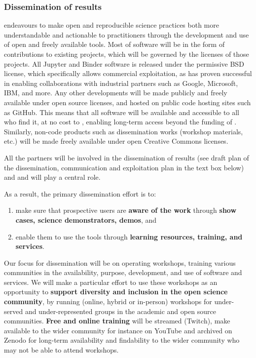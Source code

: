 \subsubsection{Dissemination of results}

 \TheProject endeavours to make open and reproducible science practices both more understandable and actionable
 to practitioners through the development and use of open and freely available tools.
Most of \TheProject software will be in the form of contributions to existing projects,
which will be governed by the licenses of those projects.
All Jupyter and Binder software is released under the permissive BSD license,
which specifically allows commercial exploitation,
as has proven successful in enabling collaborations with industrial partners
such as Google, Microsoft, IBM, and more.
Any other developments will  be made publicly and freely available under open source licenses, and
hosted on public code hosting sites such as GitHub.
This means that all \TheProject software will be available and accessible to all who find it,
at no cost to \TheProject,
enabling long-term access beyond the funding of \TheProject.
Similarly, non-code products such as dissemination works
(workshop materials, etc.) will be made freely available under open Creative Commons licenses.


All the partners will be involved in the dissemination of \TheProject results (see draft plan of the
dissemination, communication and exploitation plan in the text box below) and
 and  will play a central role.

As a result, the primary dissemination effort is to:

\begin{enumerate}
  \item make sure that prospective users are \textbf{aware of the work} through \textbf{show cases, science demonstrators, demos}, and
  \item enable them to use the tools through \textbf{learning resources, training, and services}.
\end{enumerate}

Our focus for dissemination will be on
operating workshops, training various communities in the availability,
purpose, development, and use of \TheProject software and services.
We will make a particular effort to use these workshops as an opportunity
to \textbf{support diversity and inclusion in the open science community},
by running (online, hybrid or in-person) workshops for under-served and under-represented groups in the academic and
open source communities. \textbf{Free and online training} will be streamed (Twitch),
 make available to the wider community for instance on YouTube and archived on Zenodo for long-term availability and
 findability to the wider community who may not be able to attend workshops.



